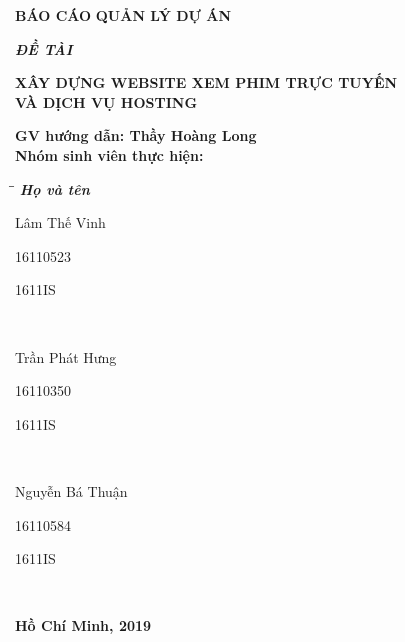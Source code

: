 \documentclass[a4paper]{book}
\begin{document}
\begin{titlepage}
\begin{center}
    \vspace{10pt}
    \fontsize{18pt}{17pt}\selectfont 
    \textbf{BÁO CÁO}
    \vspace{7pt}
    \textbf{QUẢN LÝ DỰ ÁN}
\end{center}
\begin{flushleft}
    \fontsize{14pt}{17pt}\selectfont  
    \textbf{\textsl{ĐỀ TÀI}}
\end{flushleft}
\begin{center}
    \fontsize{18pt}{17pt}\selectfont
    \textbf{XÂY DỰNG WEBSITE XEM PHIM TRỰC TUYẾN \\}
    \textbf{VÀ DỊCH VỤ HOSTING}
\end{center}
\textbf{GV hướng dẫn: Thầy Hoàng Long}
\\
\textbf{Nhóm sinh viên thực hiện:}
\begin{tabbing}
\hspace{8cm}\=\hspace{3cm}\=\hspace{3cm} \kill
{\it \textbf{Họ và tên}}\\
\begin{bfseries}Lâm Thế Vinh\end{bfseries}\> \begin{bfseries}16110523\end{bfseries}\> \begin{bfseries}1611IS\end{bfseries}\\
\begin{bfseries}Trần Phát Hưng\end{bfseries}\> \begin{bfseries}16110350\end{bfseries}\> \begin{bfseries}1611IS\end{bfseries}\\
\begin{bfseries}Nguyễn Bá Thuận\end{bfseries}\> \begin{bfseries}16110584\end{bfseries}\> \begin{bfseries}1611IS\end{bfseries}\\

\end{tabbing}
\begin{center}
    \textbf{Hồ Chí Minh, 2019}
\end{center}
\vspace{10pt}
\end{titlepage}
\tableofcontents
\end{document}

